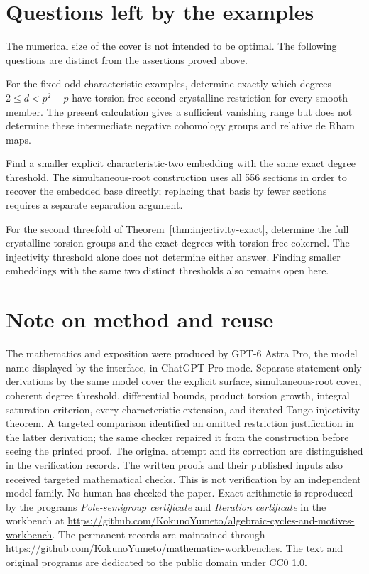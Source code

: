 \documentclass[11pt,a4paper]{article}
\newcommand{\workbenchurl}{https://github.com/KokunoYumeto/algebraic-cycles-and-motives-workbench}
\newcommand{\recordurl}{https://github.com/KokunoYumeto/mathematics-workbenches}
\theoremstyle{definition}\newtheorem{definition}[theorem]{Definition}
\theoremstyle{remark}\newtheorem{remark}[theorem]{Remark}
\numberwithin{equation}{section}
\begin{document}
\section{Questions left by the examples}

The numerical size of the cover is not intended to be optimal. The following questions are distinct from the assertions proved above.

For the fixed odd-characteristic examples, determine exactly which degrees $2\le d<p^2-p$ have torsion-free second-crystalline restriction for every smooth member. The present calculation gives a sufficient vanishing range but does not determine these intermediate negative cohomology groups and relative de Rham maps.

Find a smaller explicit characteristic-two embedding with the same exact degree threshold. The simultaneous-root construction uses all 556 sections in order to recover the embedded base directly; replacing that basis by fewer sections requires a separate separation argument.

For the second threefold of Theorem~\ref{thm:injectivity-exact}, determine the full crystalline torsion groups and the exact degrees with torsion-free cokernel. The injectivity threshold alone does not determine either answer. Finding smaller embeddings with the same two distinct thresholds also remains open here.

\section*{Note on method and reuse}

The mathematics and exposition were produced by GPT-6 Astra Pro, the model name displayed by the interface, in ChatGPT Pro mode. Separate statement-only derivations by the same model cover the explicit surface, simultaneous-root cover, coherent degree threshold, differential bounds, product torsion growth, integral saturation criterion, every-characteristic extension, and iterated-Tango injectivity theorem. A targeted comparison identified an omitted restriction justification in the latter derivation; the same checker repaired it from the construction before seeing the printed proof. The original attempt and its correction are distinguished in the verification records. The written proofs and their published inputs also received targeted mathematical checks. This is not verification by an independent model family. No human has checked the paper. Exact arithmetic is reproduced by the programs \emph{Pole-semigroup certificate} and \emph{Iteration certificate} in the workbench at \url{\workbenchurl}. The permanent records are maintained through \url{\recordurl}. The text and original programs are dedicated to the public domain under CC0 1.0.
\end{document}
